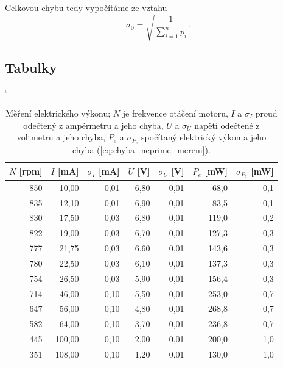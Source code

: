 \documentclass[english]{article}
\begin{document}
	Celkovou chybu tedy vypočítáme ze vztahu
	\begin{equation} \label{eq:vazeny_prumer}
	\sigma_{0}=\sqrt{\frac{1}{\sum\limits_{i=1}^{n}p_{i}}}.
	\end{equation}
	
	
\clearpage
\subsection{Tabulky}

\begin{table}[htbp]
\catcode` %

  \centering
    \begin{tabular}{|r|r|r|r|r|r|r|}
    \hline
     $N$ [rpm] & $I$ [mA] & $\sigma_I$ [mA] & $U$ [V] & $\sigma_U$ [V] & $P_e$ [mW] & $\sigma_{P_e}$ [mW] \bigstrut\\
    \hline
     850   & 10,00 & 0,01  & 6,80  & 0,01  & 68,0  & 0,1 \bigstrut\\
    \hline
    835   & 12,10 & 0,01  & 6,90  & 0,01  & 83,5  & 0,1 \bigstrut\\
    \hline
    830   & 17,50 & 0,03  & 6,80  & 0,01  & 119,0 & 0,2 \bigstrut\\
    \hline
    822   & 19,00 & 0,03  & 6,70  & 0,01  & 127,3 & 0,3 \bigstrut\\
    \hline
    777   & 21,75 & 0,03  & 6,60  & 0,01  & 143,6 & 0,3 \bigstrut\\
    \hline
    780   & 22,50 & 0,03  & 6,10  & 0,01  & 137,3 & 0,3 \bigstrut\\
    \hline
    754   & 26,50 & 0,03  & 5,90  & 0,01  & 156,4 & 0,3 \bigstrut\\
    \hline
    714   & 46,00  & 0,10   & 5,50  & 0,01  & 253,0 & 0,7 \bigstrut\\
    \hline
    647   & 56,00  & 0,10   & 4,80  & 0,01  & 268,8 & 0,7 \bigstrut\\
    \hline
    582   & 64,00  & 0,10   & 3,70  & 0,01  & 236,8 & 0,7 \bigstrut\\
    \hline
    445   & 100,00 & 0,10   & 2,00  & 0,01  & 200,0   & 1,0 \bigstrut\\
    \hline
    351   & 108,00 & 0,10   & 1,20  & 0,01  & 130,0   & 1,0 \bigstrut\\
    \hline
    \end{tabular}%
  \caption{Měření elektrického výkonu; $N$ je frekvence otáčení motoru, $I$ a $\sigma_I$ proud odečtený z ampérmetru a jeho chyba, $U$ a $\sigma_U$ napětí odečtené z voltmetru a jeho chyba, $P_e$ a $\sigma_{P_e}$ spočítaný elektrický výkon a jeho chyba (\ref{eq:chyba_neprime_mereni}). }
    
  \label{tab:vykon}%
\end{table}%
\end{document}
